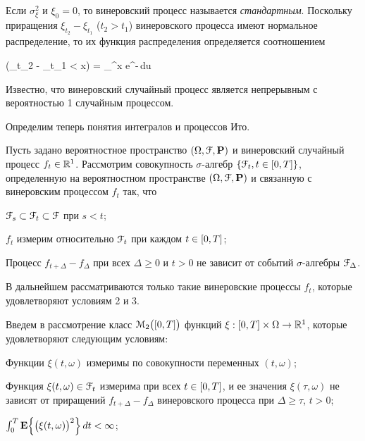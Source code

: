 Если $\sigma_\xi^2$ и $\xi_0 = 0$, то винеровский процесс называется \emph{стандартным}. Поскольку приращения $\xi_{t_2} - \xi_{t_1}$ ($t_2 > t_1$) винеровского процесса имеют нормальное распределение, то их функция распределения определяется соотношением

\beqn
	\prob(\xi_{t_2} - \xi_{t_1} < x) =  \int\limits_\infty^x e^{-}\,du 
\eeqn

Известно, что винеровский случайный процесс является непрерывным с вероятностью 1 случайным процессом.

\br

Определим теперь понятия интегралов и процессов Ито.

Пусть задано вероятностное пространство $(\Omega, \mathcal{F}, \mathbf{P})$ и винеровский случайный процесс $f_t \in \mathbb{R}^{1}$. Рассмотрим совокупность $\sigma$-алгебр $\{ \mathcal{F}_t, t \in [0, T] \}$, определенную на вероятностном пространстве $(\Omega, \mathcal{F}, \mathbf{P})$ и связанную с винеровским процессом $f_t$ так, что

\benum
	\item
		$\mathcal{F}_s \subset \mathcal{F}_t \subset \mathcal{F}$ при $s<t$;
	
	\item
		$f_t$ измерим относительно $\mathcal{F}_t$ при каждом $t \in [0, T]$;
		
	\item
		Процесс $f_{t+\Delta} - f_\Delta$ при всех $\Delta \geqslant 0$ и $t > 0$ не зависит от событий $\sigma$-алгебры $\mathcal{F}_\Delta$.
\eenum

В дальнейшем рассматриваются только такие винеровские процессы $f_t$, которые удовлетворяют условиям 2 и 3.

Введем в рассмотрение класс $\mathcal{M}_2\bigl( [0, T] \bigr)$ функций $\xi: [0, T] \times \Omega \to \mathbb{R}^{1}$, которые удовлетворяют следующим условиям:

\benum
	\item
		Функции $\xi(t, \omega)$ измеримы по совокупности переменных $(t, \omega)$;
	
	\item
		Функция $\xi(t, \omega) \in \mathcal{F}_t$ измерима при всех $t \in [0, T]$, и ее значения $\xi(\tau, \omega)$ не зависят от приращений $f_{t+\Delta} - f_\Delta$ винеровского процесса при $\Delta \geqslant \tau$, $t > 0$;
	
	\item
		$\int_0^T \mathbf{E} \Bigl\{ \bigl( \xi(t, \omega) \bigr)^2 \Bigr\}\,dt < \infty$;
	
